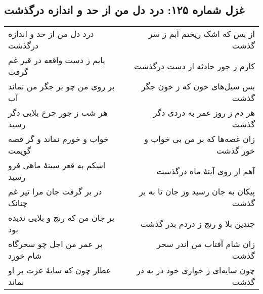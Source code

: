 \begin{center}
\section*{غزل شماره ۱۲۵: درد دل من از حد و اندازه درگذشت}
\label{sec:125}
\begin{longtable}{l p{0.5cm} r}
درد دل من از حد و اندازه درگذشت
&&
از بس که اشک ریختم آبم ز سر گذشت
\\
پایم ز دست واقعه در قیر غم گرفت
&&
کارم ز جور حادثه از دست درگذشت
\\
بر روی من چو بر جگر من نماند آب
&&
بس سیل‌های خون که ز خون جگر گذشت
\\
هر شب ز جور چرخ بلایی دگر رسید
&&
هر دم ز روز عمر به دردی دگر گذشت
\\
خواب و خورم نماند و گر قصه گویمت
&&
زان غصه‌ها که بر من بی خواب و خور گذشت
\\
اشکم به قعر سینهٔ ماهی فرو رسید
&&
آهم از روی آینهٔ ماه درگذشت
\\
در بر گرفت جان مرا تیر غم چنانک
&&
پیکان به جان رسید وز جان تا به بر گذشت
\\
بر جان من که رنج و بلایی ندیده بود
&&
چندین بلا و رنج ز دردم بدر گذشت
\\
بر عمر من اجل چو سحرگاه شام خورد
&&
زان شام آفتاب من اندر سحر گذشت
\\
عطار چون که سایهٔ عزت بر او نماند
&&
چون سایه‌ای ز خواری خود در به در گذشت
\\
\end{longtable}
\end{center}
